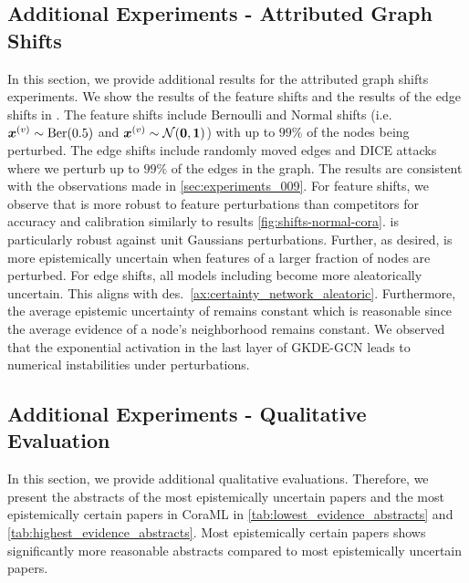 \subsection{Additional Experiments - Attributed Graph Shifts}

In this section, we provide additional results for the attributed graph shifts experiments. We show the results of the feature shifts and the results of the edge shifts in . The feature shifts include Bernoulli and Normal shifts (i.e. $\bm{x}^{(v)} \sim \operatorname{Ber}(0.5)$ and $\bm{x}^{(v)} \sim \operatorname{\mathcal{N}}(\bm{0}, \bm{1})$) with up to $99\%$ of the nodes being perturbed. The edge shifts include randomly moved edges and DICE attacks \citep{Waniek2018} where we perturb up to $99\%$ of the edges in the graph. The results are consistent with the observations made in \cref{sec:experiments_009}. For feature shifts, we observe that \GPNacro{} is more robust to feature perturbations than competitors for accuracy and calibration similarly to results \cref{fig:shifts-normal-cora}. \GPNacro{} is particularly robust against unit Gaussians perturbations. Further, as desired, \GPNacro{} is more epistemically uncertain when features of a larger fraction of nodes are perturbed. For edge shifts, all models including \GPNacro{} become more aleatorically uncertain. This aligns with des.~\ref{ax:certainty_network_aleatoric}. Furthermore, the average epistemic uncertainty of \GPNacro{} remains constant which is reasonable since the average evidence of a node's neighborhood remains constant. We observed that the exponential activation in the last layer of GKDE-GCN leads to numerical instabilities under perturbations.
%








%

\subsection{Additional Experiments - Qualitative Evaluation}
\label{sec:add-exp-qualitative}

In this section, we provide additional qualitative evaluations. Therefore, we present the abstracts of the most epistemically uncertain papers and the most epistemically certain papers in CoraML in \cref{tab:lowest_evidence_abstracts} and \cref{tab:highest_evidence_abstracts}. Most epistemically certain papers shows significantly more reasonable abstracts compared to most epistemically uncertain papers.

